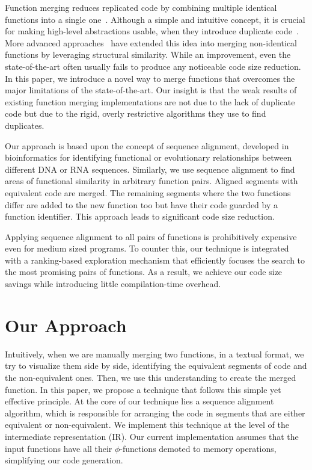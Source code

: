\documentclass[10pt,twocolumn,nocopyrightspace]{sigplanconf}
\begin{document}
Function merging reduces replicated code by combining multiple identical
functions into a single one~\cite{llvm-fm,livska14}. 
Although a simple and intuitive concept, it is crucial for making high-level
abstractions usable, when they introduce duplicate code~\cite{tallam10,kwan12}.
More advanced approaches~\cite{edler14} have extended this idea into
merging non-identical functions by leveraging structural similarity.
While an improvement, even the state-of-the-art often usually fails to produce any
noticeable code size reduction. In this paper, we introduce a novel way to merge
functions that overcomes the major limitations of the state-of-the-art. Our
insight is that the weak results of existing function merging implementations
are not due to the lack of duplicate code but due to the rigid, overly restrictive
algorithms they use to find duplicates.

Our approach is based upon the concept of sequence alignment, developed in
bioinformatics for identifying functional or evolutionary relationships between
different DNA or RNA sequences. Similarly, we use sequence alignment to find
areas of functional similarity in arbitrary function pairs. Aligned segments
with equivalent code are merged. The remaining segments where the two functions
differ are added to the new function too but have their code guarded by a
function identifier. This approach leads to significant code size reduction.

Applying sequence alignment to all pairs of functions is prohibitively expensive
even for medium sized programs. To counter this, our technique is integrated with
a ranking-based exploration mechanism that efficiently focuses the search to the most
promising pairs of functions. 
As a result, we achieve our code size savings while introducing little compilation-time
overhead.

\section{Our Approach} \label{sec:fm}

Intuitively, when we are manually merging two functions, in a textual format, we try to visualize them side by side, identifying the
equivalent segments of code and the non-equivalent ones. Then, we use this understanding to create the merged function. In this paper, we
propose a technique that follows this simple yet effective principle. At the core of our technique lies a sequence alignment algorithm,
which is responsible for arranging the code in segments that are either equivalent or non-equivalent.
We implement this technique at the level of the intermediate representation (IR).
Our current implementation assumes that the input functions have all their $\phi$-functions demoted to memory operations,
simplifying our code generation.
\end{document}
